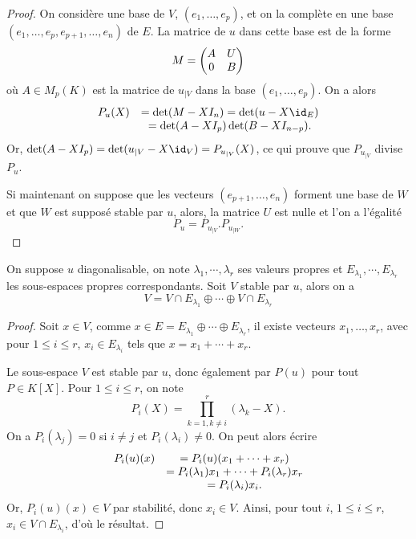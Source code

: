 \documentclass[class=report,crop=false]{standalone}
\begin{document}
\begin{proof}
On considère une base de $V$, $(e_1,\dots,e_p)$, et on la complète en une base $(e_1,\dots,e_p,e_{p+1},\dots,e_n)$ de $E$. La matrice de $u$ dans cette base est de la forme 
$$M=\left(\begin{matrix}A & U\cr 0 & B\end{matrix}\right)$$
où $A\in M_p(K)$ est la matrice de $u_{|V}$ dans la base $(e_1,\dots,e_p)$. On a alors
$$\begin{array}{cc}P_u(X)& = \det(M-XI_n)=\det(u-X\id_E)\cr &=\det(A-XI_p)\det(B-XI_{n-p}).\end{array}$$
Or, $\det(A-XI_p)=\det (u_{|V}-X\id_V)=P_{u_{|V}}(X)$, ce qui prouve que $P_{u_{|V}}$ divise $P_u$.

Si maintenant on suppose que les vecteurs $(e_{p+1},\dots,e_n)$ forment une base de $W$ et que $W$ est supposé stable par $u$, alors, la matrice $U$ est nulle et l'on a l'égalité
$$P_u=P_{u_{|V}}.P_{u_{|W}}.$$
\end{proof}





\begin{proposition}
On suppose  $u$ diagonalisable, on note $\lambda_1,\cdots,\lambda_r$ ses valeurs propres
et $E_{\lambda_1},\cdots,E_{\lambda_r}$ les sous-espaces propres correspondants. 
Soit $V$ stable par $u$, alors on a 
$$V=V\cap E_{\lambda_1}\oplus\cdots\oplus V\cap E_{\lambda_r}$$
\end{proposition} 

\begin{proof}
Soit $x\in V$, comme $x\in E=E_{\lambda_1}\oplus\cdots\oplus E_{\lambda_r}$, il existe 
vecteurs $x_1,\dots,x_r$, avec pour $1\leq i\leq r$, $x_i\in E_{\lambda_i}$ tels que $x=x_1+\cdots+x_r$.

Le sous-espace $V$ est stable par $u$, donc également par $P(u)$ pour tout $P\in K[X]$. Pour $1\leq i\leq r$, on note 
$$P_i(X)=\prod_{k=1,k\neq i}^r(\lambda_k-X).$$
On a $P_i(\lambda_j)=0$ si $i\neq j$ et $P_i(\lambda_i)\neq 0$. On peut alors écrire
$$\begin{array}{cc}P_i(u)(x)&=P_i(u)(x_1+\cdots+x_r)\cr &=P_i(\lambda_1)x_1+\cdots+P_i(\lambda_r)x_r\cr&=P_i(\lambda_i)x_i.\end{array}$$
Or, $P_i(u)(x)\in V$ par stabilité, donc $x_i\in V$. Ainsi, pour tout $i$, $1\leq i\leq r$, $x_i\in V\cap E_{\lambda_i}$, d'où le résultat.
\end{proof}


\end{document}
